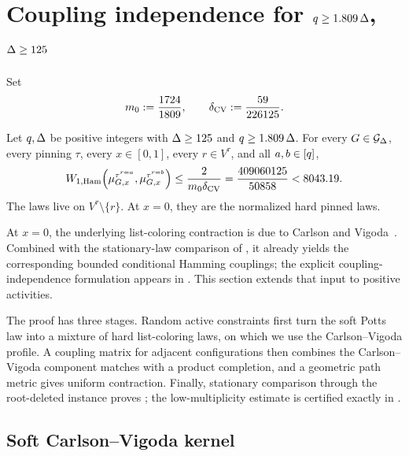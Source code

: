 \section{\texorpdfstring{Coupling independence for \(q\ge1.809\,\Deg\), \(\Deg\ge125\)}
{Coupling independence for q >= 1.809 Delta, Delta >= 125}}
\label{sec:below-vigoda}

Set
\begin{equation}\label{eq:cv-main-constants}
  m_0:=\frac{1724}{1809},
  \qquad
  \delta_{\rm CV}:=\frac{59}{226125}.
\end{equation}

\begin{theorem}
\label{thm:cv-ci}
Let \(q,\Deg\) be positive integers with \(\Deg\ge125\) and
\(q\ge1.809\,\Deg\).  For every \(G\in\Gdeg\), every pinning \(\tau\),
every \(x\in[0,1]\), every \(r\in V^\tau\), and all
\(a,b\in\colours\),
\begin{equation}\label{eq:cv-ci}
  \WHam\!\left(
    \mupin{G}{\tau^{r=a}}{x},
    \mupin{G}{\tau^{r=b}}{x}
  \right)
  \le \frac{2}{m_0\delta_{\rm CV}}
  =\frac{409060125}{50858}<8043.19.
\end{equation}
The laws live on \(V^\tau\setminus\{r\}\).  At \(x=0\), they are the
normalized hard pinned laws.
\end{theorem}

At \(x=0\), the underlying list-coloring contraction is due to Carlson and
Vigoda~\cite[Theorem~4.12 and the proof of Corollary~1.2]{CarlsonVigoda2024}.
Combined with the stationary-law comparison of
\cite[Lemma~4.3]{BlancaEtAl2022Coupling}, it already yields the corresponding
bounded conditional Hamming couplings; the explicit coupling-independence
formulation appears in \cite[Theorem~20 and Proposition~21]{CFFGZZ2024}.
This section extends that input to positive activities.

The proof has three stages.  Random active constraints first turn the soft
Potts law into a mixture of hard list-coloring laws, on which we use the
Carlson--Vigoda profile.  A coupling matrix for adjacent configurations
then combines the Carlson--Vigoda component matches with a product
completion, and a geometric path metric gives uniform contraction.
Finally, stationary comparison through the root-deleted instance proves
; the low-multiplicity estimate is certified exactly in
.

\subsection{Soft Carlson--Vigoda kernel}


